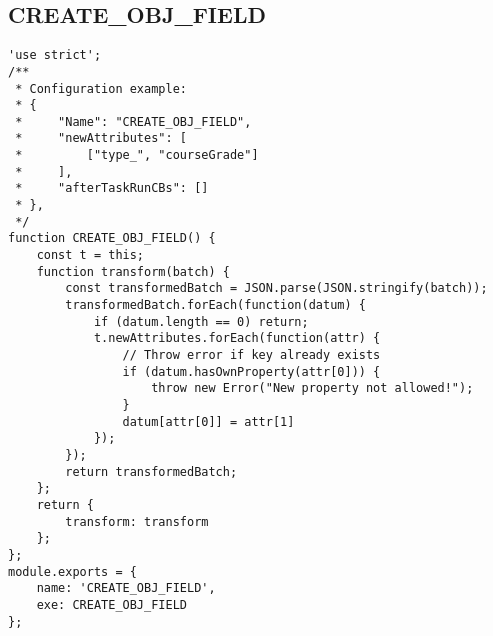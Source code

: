 \subsection{CREATE\_OBJ\_FIELD}
\label{netl-trans-create-obj-field}
\begin{verbatim}
'use strict';
/**
 * Configuration example:
 * {
 *     "Name": "CREATE_OBJ_FIELD",
 *     "newAttributes": [
 *         ["type_", "courseGrade"]
 *     ],
 *     "afterTaskRunCBs": []
 * },
 */
function CREATE_OBJ_FIELD() {
    const t = this;
    function transform(batch) {
        const transformedBatch = JSON.parse(JSON.stringify(batch));
        transformedBatch.forEach(function(datum) {
            if (datum.length == 0) return;
            t.newAttributes.forEach(function(attr) {
                // Throw error if key already exists
                if (datum.hasOwnProperty(attr[0])) {
                    throw new Error("New property not allowed!");
                }
                datum[attr[0]] = attr[1]
            });
        });
        return transformedBatch;
    };
    return {
        transform: transform
    };
};
module.exports = {
    name: 'CREATE_OBJ_FIELD',
    exe: CREATE_OBJ_FIELD
};
\end{verbatim}
